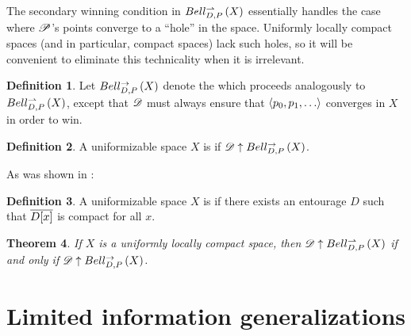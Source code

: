 \documentclass{amsart}
\newtheorem{thm}{Theorem}[section]
\theoremstyle{definition}
\newtheorem{defn}[thm]{Definition}
\begin{document}
The secondary winning condition in $Bell_{D,P}^{\rightharpoonup}\left({X}\right)$
essentially handles the case where
$\mathscr{P}$'s points converge to a ``hole'' in the space. Uniformly locally
compact spaces (and in particular, compact spaces) lack such holes, so it
will be convenient to eliminate this technicality when it is irrelevant.

\begin{defn}
  Let $Bell_{D,P}^{\to}\left({X}\right)$ denote the
   which
  proceeds analogously to $Bell_{D,P}^{\rightharpoonup}\left({X}\right)$, except
  that $\mathscr{D}$ must always ensure that $\<p_0,p_1,\dots\>$ converges
  in $X$ in order to win.
\end{defn}

\begin{defn}
  A uniformizable space $X$ is  if
  $\mathscr{D} \uparrow Bell_{D,P}^{\to}\left({X}\right)$.
\end{defn}

As was shown in \cite{MR3227201}:

\begin{defn}
  A uniformizable space $X$ is  if there
  exists an entourage $D$ such that $\overline{D[x]}$ is compact
  for all $x$.
\end{defn}

\begin{thm}
  If $X$ is a uniformly locally compact space, then
  $\mathscr{D} \uparrow Bell_{D,P}^{\rightharpoonup}\left({X}\right)$ if and only if
  $\mathscr{D} \uparrow Bell_{D,P}^{\to}\left({X}\right)$.
\end{thm}


\section{Limited information generalizations}


\newpage



\end{document}
